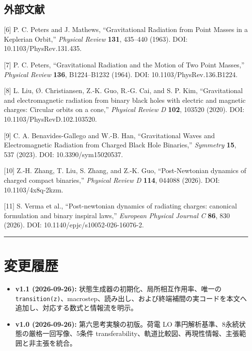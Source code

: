 \documentclass[
  a4paper,
]{ltjsarticle}
\providecommand{\tightlist}{%
  \setlength{\itemsep}{0pt}\setlength{\parskip}{0pt}}
\begin{document}
\subsection{外部文献}\label{ux5916ux90e8ux6587ux732e}

{[}6{]} P. C. Peters and J. Mathews, ``Gravitational Radiation from
Point Masses in a Keplerian Orbit,'' \emph{Physical Review}
\textbf{131}, 435--440 (1963). DOI: 10.1103/PhysRev.131.435.

{[}7{]} P. C. Peters, ``Gravitational Radiation and the Motion of Two
Point Masses,'' \emph{Physical Review} \textbf{136}, B1224--B1232
(1964). DOI: 10.1103/PhysRev.136.B1224.

{[}8{]} L. Liu, Ø. Christiansen, Z.-K. Guo, R.-G. Cai, and S. P. Kim,
``Gravitational and electromagnetic radiation from binary black holes
with electric and magnetic charges: Circular orbits on a cone,''
\emph{Physical Review D} \textbf{102}, 103520 (2020). DOI:
10.1103/PhysRevD.102.103520.

{[}9{]} C. A. Benavides-Gallego and W.-B. Han, ``Gravitational Waves and
Electromagnetic Radiation from Charged Black Hole Binaries,''
\emph{Symmetry} \textbf{15}, 537 (2023). DOI: 10.3390/sym15020537.

{[}10{]} Z.-H. Zhang, T. Liu, S. Zhang, and Z.-K. Guo, ``Post-Newtonian
dynamics of charged compact binaries,'' \emph{Physical Review D}
\textbf{114}, 044088 (2026). DOI: 10.1103/4x8q-2kzm.

{[}11{]} S. Verma et al., ``Post-newtonian dynamics of radiating
charges: canonical formulation and binary inspiral laws,''
\emph{European Physical Journal C} \textbf{86}, 830 (2026). DOI:
10.1140/epjc/s10052-026-16076-2.

\begin{center}\rule{0.5\linewidth}{0.5pt}\end{center}

\section{変更履歴}\label{ux5909ux66f4ux5c65ux6b74}

\begin{itemize}
\tightlist
\item
  \textbf{v1.1 (2026-09-26):} 状態生成器の初期化、局所相互作用率、唯一の
  \texttt{transition(z)}、macrostep、読み出し、および終端補間の実コードを本文へ追加し、対応する数式と情報流を明示。
\item
  \textbf{v1.0 (2026-09-26):} 第六思考実験の初版。荷電 LO
  準円解析基準、8永続状態の厳格一回写像、5条件
  transferability、軌道比較図、再現性情報、主張範囲と非主張を統合。
\end{itemize}
\end{document}
